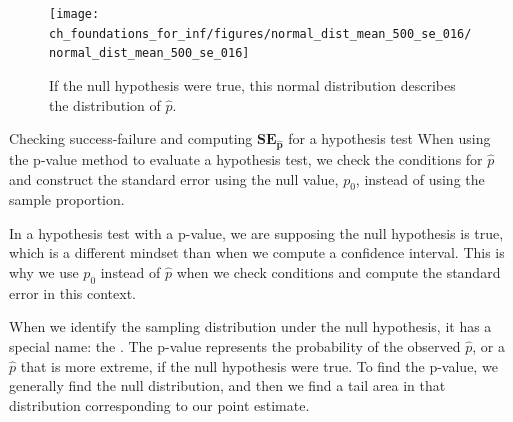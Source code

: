 \begin{figure}[h]
\centering
\texttt{[image: ch\_foundations\_for\_inf/figures/normal\_dist\_mean\_500\_se\_016/normal\_dist\_mean\_500\_se\_016]}
\caption{
  If the null hypothesis were true, this normal distribution
  describes the distribution of $\hat{p}$.}
\label{normal_dist_mean_500_se_016}
\end{figure}

\begin{onebox}{Checking success-failure and computing
      $\mathbf{SE_{\hat{p}}}$
      for a hypothesis test}
  When using the p-value method to evaluate a hypothesis test,
  we check the conditions for $\hat{p}$ and construct the
  standard error using the null value, $p_0$, instead of using
  the sample proportion. \stdvspace{}

  In a hypothesis test with a p-value, we are supposing the
  null hypothesis is true,
  which is a different mindset than when we compute
  a confidence interval.
  This is why we use $p_0$ instead of $\hat{p}$
  when we check conditions and compute the standard error
  in this context.
\end{onebox}

When we identify the sampling distribution under the null hypothesis,
it has a special name: the .
The p-value represents the probability of the observed $\hat{p}$,
or a $\hat{p}$ that is more extreme,
if the null hypothesis were true.
To find the p-value, we generally find the null distribution,
and then we find a tail area in that distribution corresponding
to our point estimate.

